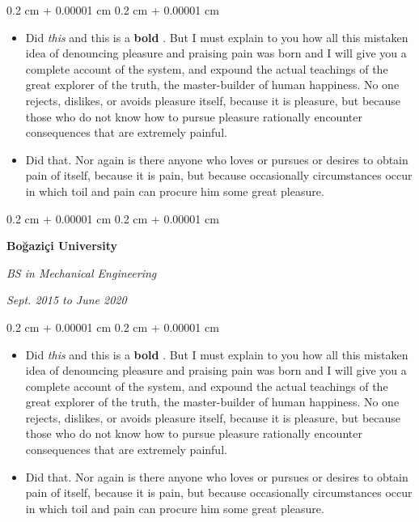 \documentclass[10pt, letterpaper]{article}
\newenvironment{highlights}{
    \begin{itemize}[
        topsep=0.10 cm,
        parsep=0.10 cm,
        partopsep=0pt,
        itemsep=0pt,
        leftmargin=0.4 cm + 10pt
    ]
}{
    \end{itemize}
} %
\newenvironment{onecolentry}{
    \begin{adjustwidth}{
        0.2 cm + 0.00001 cm
    }{
        0.2 cm + 0.00001 cm
    }
}{
    \end{adjustwidth}
} %
\newenvironment{twocolentry}[2][]{
    \onecolentry
    \def\secondColumn{#2}
    \setcolumnwidth{\fill, 4.5 cm}
    \begin{paracol}{2}
}{
    \switchcolumn \raggedleft \secondColumn
    \end{paracol}
    \endonecolentry
} %
\let\hrefWithoutArrow\href
\renewcommand{\href}[2]{\hrefWithoutArrow{#1}{\mbox{\ifthenelse{\equal{#2}{}}{ }{#2 }\raisebox{.15ex}{\footnotesize \faExternalLink*}}}}
\begin{document}
        \vspace{0.10 cm-3px}
        \begin{onecolentry}
            \begin{highlights}
                \item Did \textit{this} and this is a \textbf{bold} \href{https://example.com}{link}. But I must explain to you how all this mistaken idea of denouncing pleasure and praising pain was born and I will give you a complete account of the system, and expound the actual teachings of the great explorer of the truth, the master-builder of human happiness. No one rejects, dislikes, or avoids pleasure itself, because it is pleasure, but because those who do not know how to pursue pleasure rationally encounter consequences that are extremely painful.
                \item Did that. Nor again is there anyone who loves or pursues or desires to obtain pain of itself, because it is pain, but because occasionally circumstances occur in which toil and pain can procure him some great pleasure.
            \end{highlights}
        \end{onecolentry}


        \vspace{0.2 cm-3px}

        \begin{twocolentry}{
            
            
        \textit{Sept. 2015 to June 2020}}
            \textbf{Boğaziçi University}

            \textit{BS in Mechanical Engineering}
        \end{twocolentry}

        \vspace{0.10 cm-3px}
        \begin{onecolentry}
            \begin{highlights}
                \item Did \textit{this} and this is a \textbf{bold} \href{https://example.com}{link}. But I must explain to you how all this mistaken idea of denouncing pleasure and praising pain was born and I will give you a complete account of the system, and expound the actual teachings of the great explorer of the truth, the master-builder of human happiness. No one rejects, dislikes, or avoids pleasure itself, because it is pleasure, but because those who do not know how to pursue pleasure rationally encounter consequences that are extremely painful.
                \item Did that. Nor again is there anyone who loves or pursues or desires to obtain pain of itself, because it is pain, but because occasionally circumstances occur in which toil and pain can procure him some great pleasure.
            \end{highlights}
        \end{onecolentry}
\end{document}
